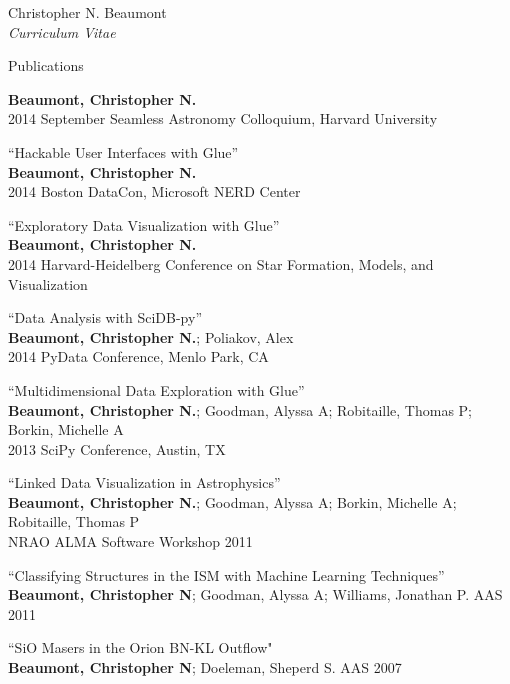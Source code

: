 \documentclass[10pt]{article}
\newenvironment{sublist}{%
	\begin{list}{}{%
		\setlength{\itemsep}{0em}\setlength{\parsep}{0em}%
		\setlength{\topsep}{0em}\setlength{\parskip}{0em}%
	}%
}%
{ \end{list} }
\begin{document}
\begin{cv}{Christopher N. Beaumont\\{\large \itshape Curriculum Vitae}}
\begin{cvlist}{Publications}
\begin{sublist}
	\textbf{Beaumont, Christopher N.} \\
	2014 September Seamless Astronomy Colloquium, Harvard University \\
	\item ``Hackable User Interfaces with Glue''\\
	\textbf{Beaumont, Christopher N.} \\
	2014 Boston DataCon, Microsoft NERD Center \\
	\item ``Exploratory Data Visualization with Glue''\\
	\textbf{Beaumont, Christopher N.} \\
	2014 Harvard-Heidelberg Conference on Star Formation, Models, and Visualization\\
	\item ``Data Analysis with SciDB-py''\\
	\textbf{Beaumont, Christopher N.}; Poliakov, Alex\\
	2014 PyData Conference, Menlo Park, CA\\
	\item ``Multidimensional Data Exploration with Glue''\\
	\textbf{Beaumont, Christopher N.}; Goodman, Alyssa A; Robitaille, Thomas P;  Borkin, Michelle A \\
	2013 SciPy Conference, Austin, TX \\
	\item ``Linked Data Visualization in Astrophysics''\\
	\textbf{Beaumont, Christopher N.}; Goodman, Alyssa A; Borkin, Michelle A; Robitaille, Thomas P \\
	NRAO ALMA Software Workshop 2011 \\
	\item ``Classifying Structures in the ISM with Machine Learning Techniques'' \\
	\textbf{Beaumont, Christopher N}; Goodman, Alyssa A; Williams, Jonathan P. AAS 2011 \\
	\item ``SiO Masers in the Orion BN-KL Outflow"\\
	\textbf{Beaumont, Christopher N}; Doeleman, Sheperd S. AAS 2007
	\end{sublist} 
\end{cvlist}
\setlength{\cvlabelwidth}{\oldcvlabelwidth}

\setlength{\oldcvlabelwidth}{\cvlabelwidth}
\setlength{\cvlabelwidth}{1em}
\setlength{\cvlabelwidth}{\oldcvlabelwidth}


\end{cv}
\end{document}
